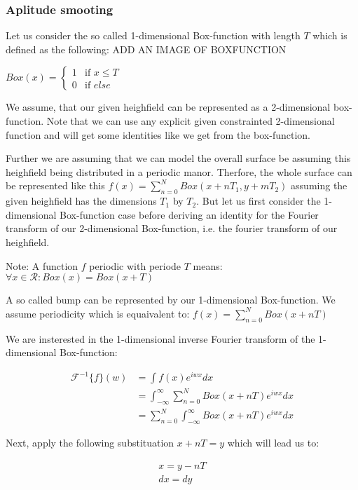 \subsubsection{Aplitude smooting}
Let us consider the so called 1-dimensional Box-function with length $T$ which is defined as the following: 
ADD AN IMAGE OF BOXFUNCTION

$
Box(x) =
\left\{
	\begin{array}{ll}
		1  & \mbox{if } x \leq T \\
		0 & \mbox{if } else
	\end{array}
\right.
$

We assume, that our given heighfield can be represented as a 2-dimensional box-function. 
Note that we can use any explicit given constrainted 2-dimensional function and will get some identities like
we get from the box-function.
 
Further we are assuming that we can model the overall surface be assuming this heighfield being distributed in a periodic manor.
Therfore, the whole surface can be represented like this $f(x) = \sum_{n=0}^{N} Box(x+nT_1, y+mT_2)$ assuming the given heighfield has the dimensions $T_1$ by $T_2$. But let us first consider the 1-dimensional Box-function case before deriving an identity for the Fourier transform of our 2-dimensional Box-function, i.e. the fourier transform of our heighfield. 

Note: A function $f$ periodic with periode $T$ means: $\forall x \in \mathcal{R}: Box(x) = Box(x+T)$

A so called bump can be represented by our 1-dimensional Box-function. We assume periodicity which is equaivalent to:   
$f(x) = \sum_{n=0}^{N} Box(x+nT)$

We are insterested in the 1-dimensional inverse Fourier transform of the 1-dimensional Box-function:

\begin{align*}
\mathcal{F}^{-1}\{f\}(w)
& =\int f(x) e^{iwx}dx\\
& =\int_{-\infty}^{\infty} \sum_{n=0}^{N} Box(x+nT) e^{iwx}dx\\
& =\sum_{n=0}^{N} \int_{-\infty}^{\infty} Box(x+nT) e^{iwx}dx
\end{align*}

Next, apply the following substituation $x+nT = y$ which will lead us to:

\begin{gather*}
x=y-nT\\
dx=dy
\end{gather*} 

